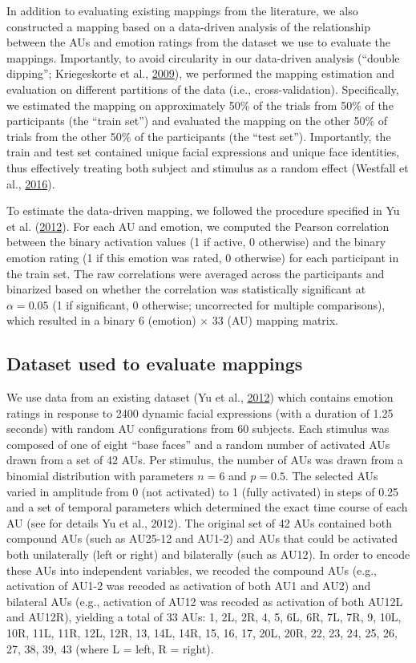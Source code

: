 \documentclass[11pt,american,a4paper,oneside,]{memoir} %
\begin{document}
In addition to evaluating existing mappings from the literature, we also constructed a mapping based on a data-driven analysis of the relationship between the AUs and emotion ratings from the dataset we use to evaluate the mappings. Importantly, to avoid circularity in our data-driven analysis (``double dipping''; Kriegeskorte et al., \protect\hyperlink{ref-kriegeskorte2009circular}{2009}), we performed the mapping estimation and evaluation on different partitions of the data (i.e., cross-validation). Specifically, we estimated the mapping on approximately 50\% of the trials from 50\% of the participants (the ``train set'') and evaluated the mapping on the other 50\% of trials from the other 50\% of the participants (the ``test set''). Importantly, the train and test set contained unique facial expressions and unique face identities, thus effectively treating both subject and stimulus as a random effect (Westfall et al., \protect\hyperlink{ref-westfall2016fixing}{2016}).

To estimate the data-driven mapping, we followed the procedure specified in Yu et al. (\protect\hyperlink{ref-Yu2012-ag}{2012}). For each AU and emotion, we computed the Pearson correlation between the binary activation values (1 if active, 0 otherwise) and the binary emotion rating (1 if this emotion was rated, 0 otherwise) for each participant in the train set. The raw correlations were averaged across the participants and binarized based on whether the correlation was statistically significant at \(\alpha = 0.05\) (1 if significant, 0 otherwise; uncorrected for multiple comparisons), which resulted in a binary 6 (emotion) × 33 (AU) mapping matrix.

\hypertarget{hka-dataset}{%
\subsection{Dataset used to evaluate mappings}\label{hka-dataset}}

We use data from an existing dataset (Yu et al., \protect\hyperlink{ref-Yu2012-ag}{2012}) which contains emotion ratings in response to 2400 dynamic facial expressions (with a duration of 1.25 seconds) with random AU configurations from 60 subjects. Each stimulus was composed of one of eight ``base faces'' and a random number of activated AUs drawn from a set of 42 AUs. Per stimulus, the number of AUs was drawn from a binomial distribution with parameters \(n = 6\) and \(p = 0.5\). The selected AUs varied in amplitude from 0 (not activated) to 1 (fully activated) in steps of 0.25 and a set of temporal parameters which determined the exact time course of each AU (see for details Yu et al., 2012). The original set of 42 AUs contained both compound AUs (such as AU25-12 and AU1-2) and AUs that could be activated both unilaterally (left or right) and bilaterally (such as AU12). In order to encode these AUs into independent variables, we recoded the compound AUs (e.g., activation of AU1-2 was recoded as activation of both AU1 and AU2) and bilateral AUs (e.g., activation of AU12 was recoded as activation of both AU12L and AU12R), yielding a total of 33 AUs: 1, 2L, 2R, 4, 5, 6L, 6R, 7L, 7R, 9, 10L, 10R, 11L, 11R, 12L, 12R, 13, 14L, 14R, 15, 16, 17, 20L, 20R, 22, 23, 24, 25, 26, 27, 38, 39, 43 (where L = left, R = right).
\end{document}
